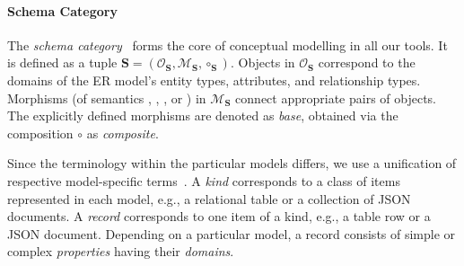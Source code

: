 \paragraph{Schema Category}
The \textit{schema category}~\citep{mm_cat_journal} forms the core of conceptual modelling in all our tools. 
%
It is defined as a tuple $\mathbf{S} = (\mathcal{O}_\mathbf{S}, \mathcal{M}_\mathbf{S}, \circ_\mathbf{S})$. Objects in $\mathcal{O}_\mathbf{S}$ correspond to the domains of the ER model's entity types, attributes, and relationship types. Morphisms (of semantics , , , or ) in $\mathcal{M}_\mathbf{S}$ connect appropriate pairs of objects. The explicitly defined morphisms are denoted as \textit{base}, obtained via the composition $\circ$ as \textit{composite}.

Since the terminology within the particular models differs, we use a unification of respective model-specific terms~\citep{mm_cat_journal}. A \textit{kind} corresponds to a class of items represented in each model, e.g., a relational table or a collection of JSON documents. A \textit{record} corresponds to one item of a kind, e.g., a table row or a JSON document. Depending on a particular model, a record consists of simple or complex \textit{properties} having their \textit{domains}.
%
%
%
%
%
%
%
%
%

